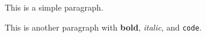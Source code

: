 This is a simple paragraph.

This is another paragraph with \textbf{bold}, \emph{italic}, and \texttt{code}.

